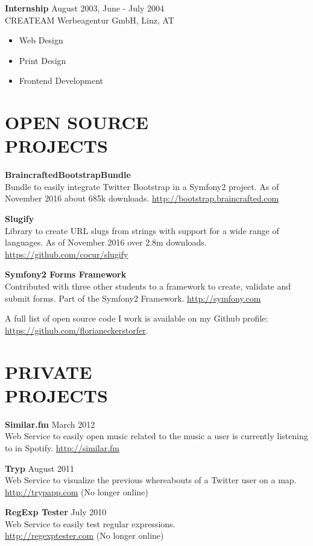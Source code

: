 \documentclass[margin]{res}
\begin{document}
\begin{resume}
\textbf{Internship} \hfill August 2003, June - July 2004 \\
  CREATEAM Werbeagentur GmbH, Linz, AT
  \begin{itemize}  \itemsep -2pt
    \item Web Design
    \item Print Design
    \item Frontend Development
  \end{itemize}

\section{OPEN SOURCE \\ PROJECTS}

\textbf{BraincraftedBootstrapBundle} \\
  Bundle to easily integrate Twitter Bootstrap in a Symfony2 project. As of November 2016 about 685k downloads. \url{http://bootstrap.braincrafted.com}

\textbf{Slugify} \\
  Library to create URL slugs from strings with support for a wide range of languages. As of November 2016 over 2.8m downloads. \url{https://github.com/cocur/slugify}

\textbf{Symfony2 Forms Framework} \\
  Contributed with three other students to a framework to create, validate and submit forms. Part of the Symfony2 Framework. \url{http://symfony.com}

A full list of open source code I work is available on my Github profile: \url{https://github.com/florianeckerstorfer}.

\section{PRIVATE \\ PROJECTS}

\textbf{Similar.fm} \hfill March 2012 \\
  Web Service to easily open music related to the music a user is currently listening to in Spotify. \url{http://similar.fm}

\textbf{Tryp} \hfill August 2011 \\
  Web Service to visualize the previous whereabouts of a Twitter user on a map. \\ \url{http://trypapp.com} (No longer online)

\textbf{RegExp Tester} \hfill July 2010 \\
  Web Service to easily test regular expressions. \\ \url{http://regexptester.com} (No longer online)


\end{resume}
\end{document}
